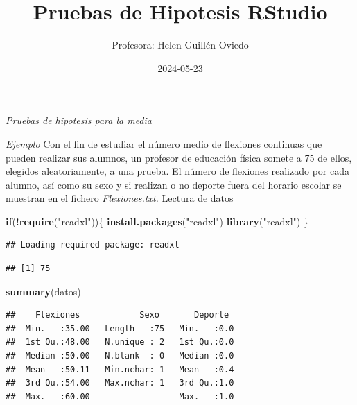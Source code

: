 \documentclass[
]{article}
\title{Pruebas de Hipotesis RStudio}
\author{Profesora: Helen Guillén Oviedo}
\date{2024-05-23}
\newenvironment{Shaded}{\begin{snugshade}}{\end{snugshade}}
\newcommand{\ControlFlowTok}[1]{\textcolor[rgb]{0.13,0.29,0.53}{\textbf{#1}}}
\newcommand{\FunctionTok}[1]{\textcolor[rgb]{0.13,0.29,0.53}{\textbf{#1}}}
\newcommand{\NormalTok}[1]{#1}
\newcommand{\OtherTok}[1]{\textcolor[rgb]{0.56,0.35,0.01}{#1}}
\newcommand{\SpecialCharTok}[1]{\textcolor[rgb]{0.81,0.36,0.00}{\textbf{#1}}}
\newcommand{\StringTok}[1]{\textcolor[rgb]{0.31,0.60,0.02}{#1}}
\begin{document}
\maketitle

\emph{Pruebas de hipotesis para la media}

\emph{Ejemplo} Con el fin de estudiar el número medio de flexiones
continuas que pueden realizar sus alumnos, un profesor de educación
física somete a 75 de ellos, elegidos aleatoriamente, a una prueba. El
número de flexiones realizado por cada alumno, así como su sexo y si
realizan o no deporte fuera del horario escolar se muestran en el
fichero \emph{Flexiones.txt.} Lectura de datos

\begin{Shaded}
\begin{Highlighting}[]
\ControlFlowTok{if}\NormalTok{(}\SpecialCharTok{!}\FunctionTok{require}\NormalTok{(}\StringTok{"readxl"}\NormalTok{))\{}
\FunctionTok{install.packages}\NormalTok{(}\StringTok{"readxl"}\NormalTok{)}
\FunctionTok{library}\NormalTok{(}\StringTok{"readxl"}\NormalTok{)}
\NormalTok{\}}
\end{Highlighting}
\end{Shaded}

\begin{verbatim}
## Loading required package: readxl
\end{verbatim}

\begin{Shaded}
\end{Shaded}

\begin{verbatim}
## [1] 75
\end{verbatim}

\begin{Shaded}
\begin{Highlighting}[]
\FunctionTok{summary}\NormalTok{(datos)}
\end{Highlighting}
\end{Shaded}

\begin{verbatim}
##    Flexiones            Sexo       Deporte   
##  Min.   :35.00   Length   :75   Min.   :0.0  
##  1st Qu.:48.00   N.unique : 2   1st Qu.:0.0  
##  Median :50.00   N.blank  : 0   Median :0.0  
##  Mean   :50.11   Min.nchar: 1   Mean   :0.4  
##  3rd Qu.:54.00   Max.nchar: 1   3rd Qu.:1.0  
##  Max.   :60.00                  Max.   :1.0
\end{verbatim}
\end{document}
